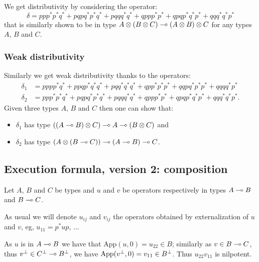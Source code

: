 We get distributivity by considering the operator:
\begin{equation*}
\delta = ppp^*p^*q^* + pqpq^*p^*q^* + pqqq^*q^* + qppp^*p^* + qpqp^*q^*p^* + qqq^*q^*p^*
\end{equation*}
that is similarly shown to be in type
\(A\otimes(B\otimes C)\multimap(A\otimes B)\otimes C\) for any types \(A\), \(B\)
and \(C\).

\subsubsection{Weak distributivity}\label{weak-distributivity}

Similarly we get weak distributivity thanks to the operators:
\begin{align*}
\delta_1 & = pppp^*q^* + ppqp^*q^*q^* + pqq^*q^*q^* + qpp^*p^*p^* + qqp q^*p^*p^* + qqq q^*p^* \\
\delta_2 &= ppp^*p^*q^* + pqpq^*p^*q^* + pqqq^*q^* + qppp^*p^* + qpqp^*q^*p^* + qqq^*q^*p^*.
\end{align*}
Given three types \(A\), \(B\) and \(C\) then one can show that:
\begin{itemize}
\item \(\delta_1\) has type \(((A\multimap B)\otimes C)\multimap A\multimap (B\otimes C)\) and
\item \(\delta_2\) has type \((A\otimes(B\multimap C))\multimap (A\multimap B)\multimap C\).
\end{itemize}

\subsection{Execution formula, version 2: composition}\label{execution-formula-version-2-composition}

Let \(A\), \(B\) and \(C\) be types and \(u\) and \(v\) be operators
respectively in types \(A\multimap B\) and \(B\multimap C\).

As usual we will denote \(u_{ij}\) and \(v_{ij}\) the operators obtained
by externalization of \(u\) and \(v\), eg, \(u_{11} = p^*up\), ...

As \(u\) is in \(A\multimap B\) we have that
\(\mathrm{App}(u, 0)=u_{22}\in B\); similarly as \(v\in B\multimap C\), thus
\(v^\bot\in C^\bot\multimap B^\bot\), we have
\(\mathrm{App}(v^\bot, 0) = v_{11}\in B^\bot\). Thus \(u_{22}v_{11}\) is
nilpotent.

